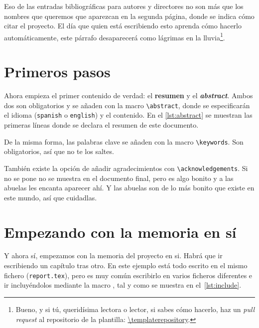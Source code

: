 \documentclass[%
    school=etsisi,%
    type=pfg,%
    degree=61CI,%
]{upm-report}
\begin{document}
Eso de las entradas bibliográficas para autores y directores no son más
que los nombres que queremos que aparezcan en la segunda página, donde
se indica cómo citar el proyecto. El día que quien está escribiendo esto
aprenda cómo hacerlo automáticamente, este párrafo desaparecerá como
lágrimas en la lluvia\footnote{Bueno, y si tú, queridísima lectora o
lector, si sabes cómo hacerlo, haz un \textit{pull request} al
repositorio de la plantilla: \url{\templaterepository}.}.

\section{Primeros pasos}

Ahora empieza el primer contenido de verdad: el \textbf{resumen} y el
\textbf{\textit{abstract}}. Ambos dos son obligatorios y se añaden con
la macro \lstinline{\abstract}, donde se especificarán el idioma
(\texttt{spanish} o \texttt{english}) y el contenido. En el
\autoref{lst:abstract} se muestran las primeras líneas donde se declara
el resumen de este documento.



De la misma forma, las palabras clave se añaden con la macro
\lstinline{\keywords}. Son obligatorios, así que no te los saltes.



También existe la opción de añadir agradecimientos con
\lstinline{\acknowledgements}. Si no se pone no se muestra en el
documento final, pero es algo bonito y a las abuelas les encanta
aparecer ahí. Y las abuelas son de lo más bonito que existe en este
mundo, así que cuidadlas.

\section{Empezando con la memoria en sí}

Y ahora sí, empezamos con la memoria del proyecto en si. Habrá que ir
escribiendo un capítulo tras otro. En este ejemplo está todo escrito en
el mismo fichero (\texttt{report.tex}), pero es muy común escribirlo en
varios ficheros diferentes e ir incluyéndolos mediante la macro
\lstinline{}, tal y como se muestra en el~\autoref{lst:include}.
\end{document}
